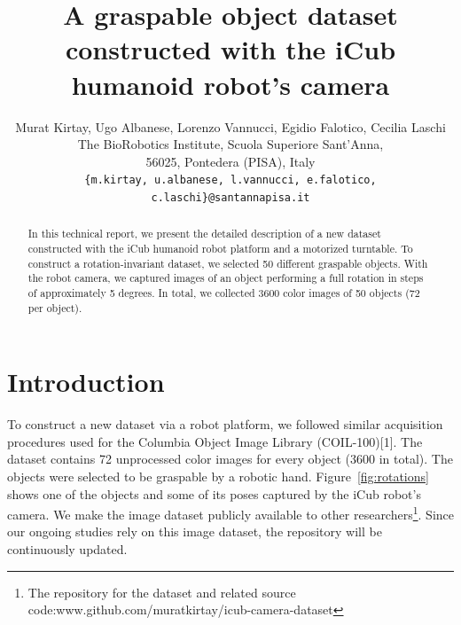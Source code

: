 \documentclass{article}
\title{A graspable object dataset constructed  with the  iCub humanoid robot's camera}
\author{
Murat Kirtay, Ugo Albanese, Lorenzo Vannucci, Egidio Falotico, Cecilia Laschi\\
  The BioRobotics Institute, 
Scuola Superiore Sant'Anna,\\
  56025, Pontedera (PISA), Italy\\
  \texttt{\{m.kirtay, u.albanese, l.vannucci, e.falotico, c.laschi\}@santannapisa.it} \\
}
\begin{document}

\maketitle
\pagestyle{empty} 


\begin{abstract}
In this technical report, we present the detailed description of a new dataset constructed with the iCub humanoid robot platform and a motorized turntable.  To construct a rotation-invariant dataset, we selected 50 different graspable objects. With the robot camera, we captured images of an object performing a full rotation in steps of approximately 5 degrees. In total, we collected 3600 color images of 50 objects (72 per object). 
\end{abstract}

\section{Introduction}
To construct a new dataset via a robot platform, we followed similar acquisition procedures used for the Columbia Object Image Library (COIL-100)[1].  The dataset contains 72  unprocessed color images for every object (3600 in total).  The objects were selected to be graspable by a robotic hand.  Figure~\ref{fig:rotations} shows one of the objects and some of its poses captured by the iCub robot's camera.  We make the image dataset publicly available to other researchers\footnote{The repository for the dataset and related source code:www.github.com/muratkirtay/icub-camera-dataset}.
Since our ongoing studies rely on this image dataset, the repository will be continuously updated.
\end{document}
